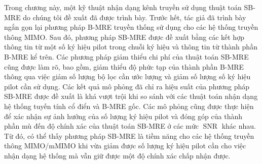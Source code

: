 Trong chương này, một kỹ thuật nhận dạng kênh truyền sử dụng thuật toán SB-MRE do chúng tôi đề xuất đã được trình bày. Trước hết, tác giả đã trình bày ngắn gọn lại phương pháp B-MRE truyền thống sử dụng cho các hệ thống truyền thông MIMO. Sau đó, phương pháp SB-MRE được đề xuất bằng các kết hợp thông tin từ một số ký hiệu pilot trong chuỗi ký hiệu và thông tin từ thành phần B-MRE kể trên. Các phương pháp giảm thiểu chi phí của thuật toán SB-MRE cũng được làm rõ, bao gồm, giảm thiểu độ phức tạp của thành phần B-MRE thông qua việc giảm số lượng bộ lọc cần ước lượng và giảm số lượng số ký hiệu pilot cần sử dụng. Các kết quả mô phỏng đã chỉ ra hiệu suất của phương pháp SB-MRE được đề xuất là khá vượt trội khi so sánh với các thuật toán nhận dạng hệ thống tuyến tính cổ điển và B-MRE gốc. Các mô phỏng cũng được thực hiện để xác nhận sự ảnh hưởng của số lượng ký hiệu pilot và đóng góp của thành phần mù đến độ chính xác của thuật toán SB-MRE ở các mức $\operatorname{SNR}$ khác nhau. Từ đó, có thể thấy phương pháp SB-MRE là tiềm năng cho các hệ thống truyền thông MIMO/mMIMO khi vừa giảm được số lượng ký hiệu pilot cần cho việc nhận dạng hệ thống mà vẫn giữ được một độ chính xác chấp nhận được.